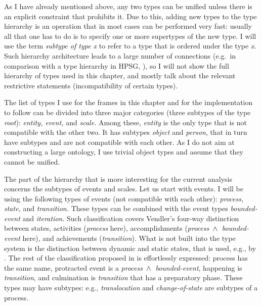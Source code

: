 As I have already mentioned above, any two types can be unified unless there is an explicit constraint that prohibits it. Due to this, adding new types to the type hierarchy is an operation that in most cases can be performed very fast: usually all that one has to do is to specify one or more supertypes of the new type. I will use the term \textit{subtype of type x} to refer to a type that is ordered under the type \textit{x}. Such hierarchy architecture leads to a large number of connections (e.g.\ in comparison with a type hierarchy in HPSG, \citealt{PollardSag:94}), so I will not show the full hierarchy of types used in this chapter, and mostly talk about the relevant restrictive statements (incompatibility of certain types).

The list of types I use for the frames in this chapter and for the implementation to follow can be divided into three major categories (three subtypes of the type \textit{root}): \textit{entity, event,} and \textit{scale.} Among these, \textit{entity} is the only type that is not compatible with the other two. It has subtypes \textit{object} and \textit{person}, that in turn have subtypes and are not compatible with each other. As I do not aim at constructing a large ontology, I use trivial object types and assume that they cannot be unified.

The part of the hierarchy that is more interesting for the current analysis concerns the subtypes of events and scales. Let us start with events. I will be using the following types of events (not compatible with each other): \textit{process, state,} and \textit{transition.} These types can be combined with the event types \textit{bounded-event} and \textit{iteration}. Such classification covers Vendler's \citep{Vendler:67} four-way distinction between states, activities (\textit{process} here), accomplishments (\textit{process $\,\wedge\,$ bounded-event} here), and achievements (\textit{transition}). What is not built into the type system is the distinction between dynamic and static states, that is used, e.g., by \citet{Bach:86}. The rest of the classification proposed in \citealt{Bach:86} is effortlessly expressed: process has the same name, protracted event is a \textit{process $\,\wedge\,$ bounded-event}, happening is \textit{transition}, and culmination is \textit{transition} that has a preparatory phase. These types may have subtypes: e.g., \textit{translocation} and \textit{change-of-state} are subtypes of a process.


